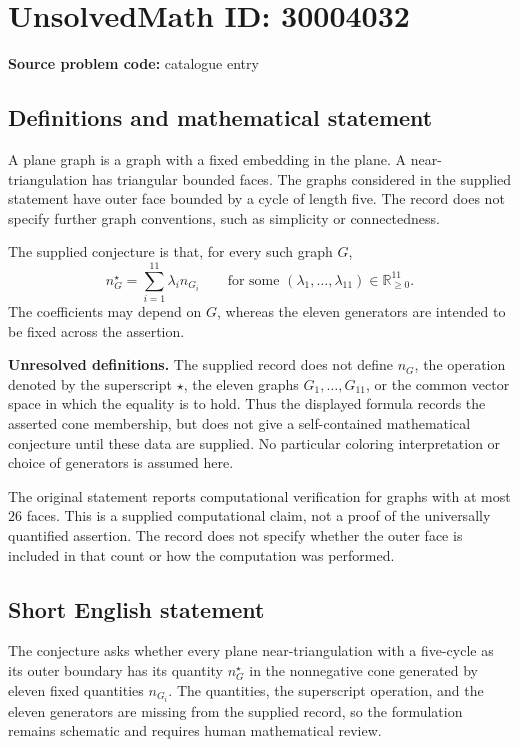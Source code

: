 \documentclass[11pt]{article}
\newcommand{\R}{\mathbb{R}}
\begin{document}
\section*{UnsolvedMath ID: 30004032}
\textbf{Source problem code:} catalogue entry
\subsection{Definitions and mathematical statement}
A plane graph is a graph with a fixed embedding in the plane. A near-triangulation has triangular bounded faces. The graphs considered in the supplied statement have outer face bounded by a cycle of length five. The record does not specify further graph conventions, such as simplicity or connectedness.

The supplied conjecture is that, for every such graph \(G\),
\[
 n_G^\star=\sum_{i=1}^{11}\lambda_i n_{G_i}
 \qquad\text{for some }(\lambda_1,\ldots,\lambda_{11})\in\R_{\geq 0}^{11}.
\]
The coefficients may depend on \(G\), whereas the eleven generators are intended to be fixed across the assertion.

\textbf{Unresolved definitions.} The supplied record does not define \(n_G\), the operation denoted by the superscript \(\star\), the eleven graphs \(G_1,\ldots,G_{11}\), or the common vector space in which the equality is to hold. Thus the displayed formula records the asserted cone membership, but does not give a self-contained mathematical conjecture until these data are supplied. No particular coloring interpretation or choice of generators is assumed here.

The original statement reports computational verification for graphs with at most \(26\) faces. This is a supplied computational claim, not a proof of the universally quantified assertion. The record does not specify whether the outer face is included in that count or how the computation was performed.
\subsection{Short English statement}
The conjecture asks whether every plane near-triangulation with a five-cycle as its outer boundary has its quantity \(n_G^\star\) in the nonnegative cone generated by eleven fixed quantities \(n_{G_i}\). The quantities, the superscript operation, and the eleven generators are missing from the supplied record, so the formulation remains schematic and requires human mathematical review.
\end{document}
